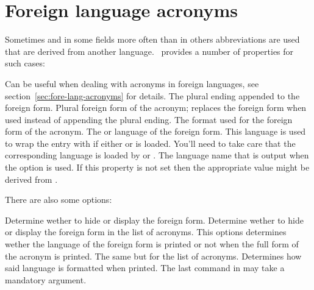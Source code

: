 \documentclass{acro-manual}
\begin{document}
\section{Foreign language acronyms}\label{sec:fore-lang-acronyms}
Sometimes and in some fields more often than in others abbreviations are used
that are derived from another language.  \acro\ provides a number of
properties for such cases:
\begin{properties}
  \Default
    Can be useful when dealing with acronyms in foreign languages, see
    section~\vref{sec:fore-lang-acronyms} for details.
    The plural ending appended to the foreign form.
  \Default
    Plural foreign form of the acronym; replaces the foreign form when used
    instead of appending the plural ending.
  \Default
    The format used for the foreign form of the acronym.
  \Default
    The  or  language of the foreign form. This
    language is used to wrap the entry with
     if either  or
     is loaded.  You'll need to take care that the
    corresponding language is loaded by  or .
  \Default
    The language name that is output when the option
    \code{/} is used.  If this property is not
    set then the appropriate value might be derived from
    .
\end{properties}
There are also some options:
\begin{options}
    Determine wether to hide or display the foreign form.
    Determine wether to hide or display the foreign form in
    the list of acronyms.
    This options determines wether the language of the foreign form is printed
    or not when the full form of the acronym is printed.
    The same but for the list of acronyms.
    Determines how said language is formatted when printed.  The last command
    in  may take a mandatory argument.
\end{options}
\end{document}
